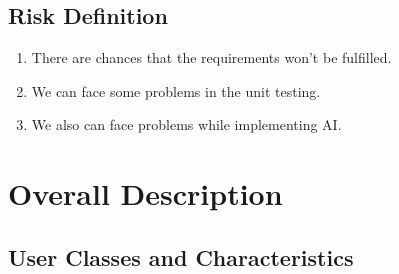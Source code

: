 \section{Risk Definition}
\begin{enumerate}
\item       There are chances that the requirements won't be fulfilled.
\item       We can face some problems in the unit testing.
\item       We also can face problems while implementing AI.
\end{enumerate}




\chapter{Overall Description}
\label{Overall Description}

\section{User Classes and Characteristics}

